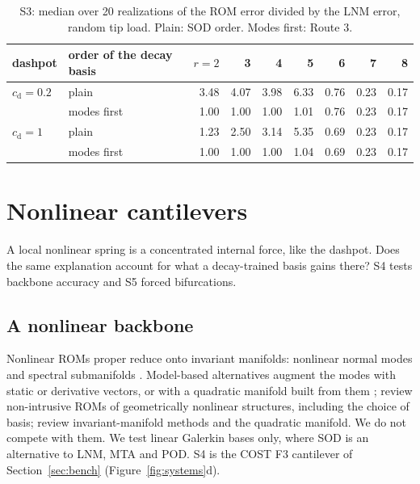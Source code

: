 \documentclass[preprint,12pt]{elsarticle}
\begin{document}
\begin{table}[tbp]
\centering\small
\caption{S3: median over 20 realizations of the ROM error divided by the LNM error, random tip load. Plain: SOD order. Modes first: Route 3.}
\label{tab:recog}
\begin{tabular}{llrrrrrrr}
\toprule
dashpot & order of the decay basis & $r=2$ & 3 & 4 & 5 & 6 & 7 & 8\\ \midrule
$c_{\mathrm d}=0.2$ & plain & 3.48 & 4.07 & 3.98 & 6.33 & 0.76 & 0.23 & 0.17\\
 & modes first & 1.00 & 1.00 & 1.00 & 1.01 & 0.76 & 0.23 & 0.17\\
$c_{\mathrm d}=1$ & plain & 1.23 & 2.50 & 3.14 & 5.35 & 0.69 & 0.23 & 0.17\\
 & modes first & 1.00 & 1.00 & 1.00 & 1.04 & 0.69 & 0.23 & 0.17\\
\bottomrule
\end{tabular}
\end{table}

\section{Nonlinear cantilevers}\label{sec:nonlin}
A local nonlinear spring is a concentrated internal force, like the dashpot. Does the same explanation account for what a decay-trained basis gains there? S4 tests backbone accuracy and S5 forced bifurcations.


\subsection{A nonlinear backbone}\label{sec:nlbb}
Nonlinear ROMs proper reduce onto invariant manifolds: nonlinear normal modes \citep{Shaw1993,Touze2004} and spectral submanifolds \citep{Haller2016,Cenedese2022}. Model-based alternatives augment the modes with static or derivative vectors, or with a quadratic manifold built from them \citep{Idelsohn1985,Jain2017}; \citet{Mignolet2013} review non-intrusive ROMs of geometrically nonlinear structures, including the choice of basis; \citet{Touze2021} review invariant-manifold methods and the quadratic manifold. We do not compete with them. We test linear Galerkin bases only, where SOD is an alternative to LNM, MTA and POD.
S4 is the COST F3 cantilever of Section~\ref{sec:bench} (Figure~\ref{fig:systems}d).
\end{document}
